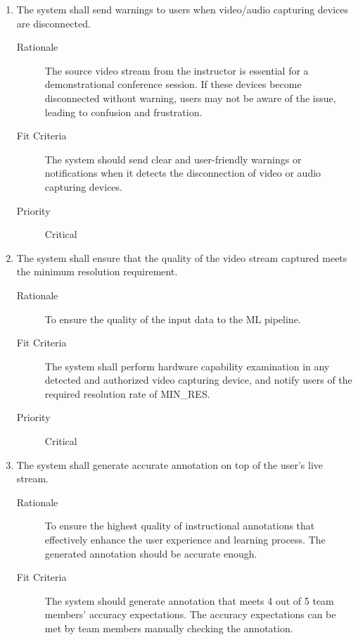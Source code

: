 \documentclass{article}
\begin{document}
\begin{enumerate}[label=\textbf{PR\arabic*}]
\item The system shall send warnings to users when video/audio capturing devices
  are disconnected. \label{PR10}
  \begin{description}
  \item[Rationale] The source video stream from the instructor is essential for a
    demonstrational conference session. If these devices become disconnected
    without warning, users may not be aware of the issue, leading to confusion
    and frustration.
	\item[Fit Criteria] The system should send clear and user-friendly warnings or
    notifications when it detects the disconnection of video or audio capturing
    devices.
	\item[Priority] Critical
  \end{description}
\item The system shall ensure that the quality of the video stream captured meets
  the minimum resolution requirement. \label{PR11}
	\begin{description}
  \item[Rationale] To ensure the quality of the input data to the ML pipeline.
	\item[Fit Criteria] The system shall perform hardware capability examination in
    any detected and authorized video capturing device, and notify users of the
    required resolution rate of MIN\_RES.
	\item[Priority] Critical
  \end{description}
\item The system shall generate accurate annotation on top of the user's live
  stream. \label{PR12}
	\begin{description}
  \item[Rationale] To ensure the highest quality of instructional annotations that
    effectively enhance the user experience and learning process. The generated
    annotation should be accurate enough.
	\item[Fit Criteria] The system should generate annotation that meets 4 out of 5
    team members' accuracy expectations. The accuracy expectations can be met by
    team members manually checking the annotation.

\end{description}
\end{enumerate}
\end{document}
